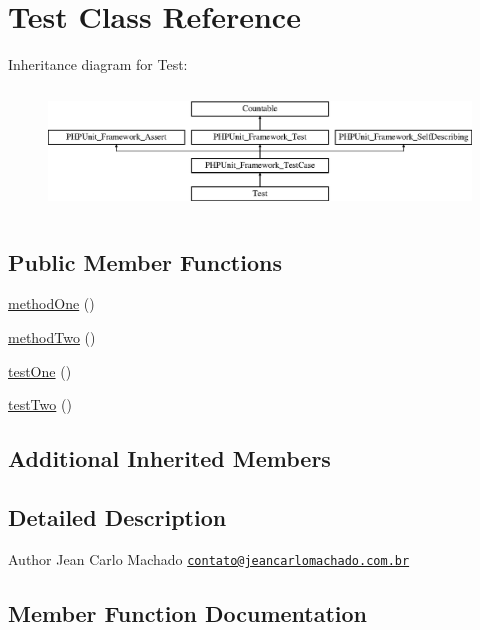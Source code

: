 \hypertarget{class_test}{}\section{Test Class Reference}
\label{class_test}
Inheritance diagram for Test\+:\begin{figure}[H]
\begin{center}
\leavevmode
\includegraphics[height=3.303835cm]{class_test}
\end{center}
\end{figure}
\subsection*{Public Member Functions}
\begin{DoxyCompactItemize}
\item 
\mbox{\hyperlink{class_test_ace69f3f8db70cbb63d91e7f9faf67210}{method\+One}} ()
\item 
\mbox{\hyperlink{class_test_adc4891c4d8a68fb4b8c93e6b6bfe88a5}{method\+Two}} ()
\item 
\mbox{\hyperlink{class_test_afbf3ff88b322c6a7197ce02297cd23a0}{test\+One}} ()
\item 
\mbox{\hyperlink{class_test_a4fb9974ce113d5d1db8075e0db0dc9b6}{test\+Two}} ()
\end{DoxyCompactItemize}
\subsection*{Additional Inherited Members}


\subsection{Detailed Description}
\begin{DoxyAuthor}{Author}
Jean Carlo Machado \href{mailto:contato@jeancarlomachado.com.br}{\tt contato@jeancarlomachado.\+com.\+br} 
\end{DoxyAuthor}


\subsection{Member Function Documentation}
\mbox{\label{class_test_ace69f3f8db70cbb63d91e7f9faf67210}} 
